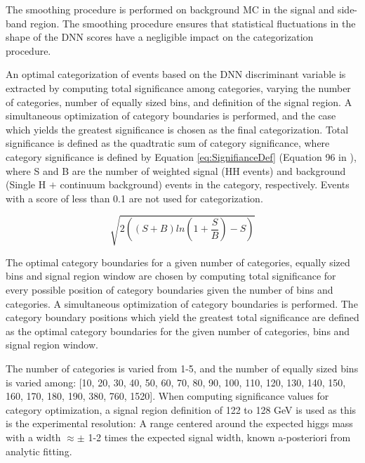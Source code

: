 
The smoothing procedure is performed on background MC in the signal and side-band region. The smoothing procedure ensures that statistical fluctuations in the shape of the 
DNN scores have a negligible impact on the categorization procedure. 


An optimal categorization of events based on the DNN discriminant variable is extracted by computing total significance among categories, varying the number of categories, number of equally sized bins, 
and definition of the signal region. A simultaneous optimization of category boundaries is performed, and the case which yields the greatest significance is chosen as the final categorization. Total significance is defined as the quadtratic sum of category 
significance, where category significance is defined by 
Equation \ref{eq:SignifianceDef} (Equation 96 in \cite{Cowan_2011}), where S and B are the number of weighted signal (HH events) and background (Single H $+$ continuum background) events in the category, respectively. Events with a score of less than 
0.1 are not used for categorization. 

\begin{equation} \label{eq:SignifianceDef}
  \sqrt{2((S + B)ln(1 + \frac{S}{B}) - S)}
\end{equation}

The optimal category boundaries for a given number of categories, equally sized bins and signal region window are chosen by computing total significance for every possible position of category boundaries 
given the number of bins and categories. A simultaneous optimization of category boundaries is performed. The category boundary positions which yield the greatest total significance are defined as the optimal category boundaries for the given number of categories,
bins and signal region window. 

The number of categories is varied from 1-5, and the number of equally sized bins is varied among: [10, 20, 30, 40, 50, 60, 70, 80, 90, 100, 110, 120, 130, 140, 150, 160, 170, 180, 190, 380, 760, 1520]. When computing significance 
values for category optimization, a signal region definition of 122 to 128 GeV is used as this is the experimental resolution: A range centered around the expected higgs mass with a width $\approx \pm$ 1-2 times the expected signal width,
known a-posteriori from analytic fitting. 

